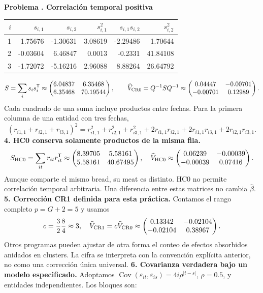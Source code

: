 \documentclass[11pt,a4paper]{article}
\newcommand{\T}{^{\mathsf T}}
\DeclareMathOperator{\Cov}{Cov}
\theoremstyle{definition}
\newcounter{problema}
\newenvironment{resuelto}[1]{\refstepcounter{problema}\par\medskip\Needspace{6\baselineskip}\textbf{Problema \theproblema. #1}\par}{\par\medskip}
\newcommand{\eps}{\varepsilon}
\begin{document}
\begin{resuelto}{Correlación temporal positiva}
\begin{center}\small
\begin{tabular}{rrrrrr}
\toprule
$i$&$s_{i,1}$&$s_{i,2}$&$s_{i,1}^2$&$s_{i,1}s_{i,2}$&$s_{i,2}^2$\\
\midrule
1&1.75676&-1.30631&3.08619&-2.29486&1.70644\\
2&-0.03604&6.46847&0.0013&-0.2331&41.84108\\
3&-1.72072&-5.16216&2.96088&8.88264&26.64792\\
\bottomrule
\end{tabular}
\end{center}
\[
S=\sum_i s_is_i\T\approx\begin{pmatrix}
6.04837&6.35468\\6.35468&70.19544
\end{pmatrix},\qquad \widehat V_{\rm CR0}=Q^{-1}SQ^{-1}\approx\begin{pmatrix}
0.04447&-0.00701\\-0.00701&0.12989
\end{pmatrix}.
\]
Cada cuadrado de una suma incluye productos entre fechas. Para la primera columna de una entidad con tres fechas,
\[
(r_{i1,1}+r_{i2,1}+r_{i3,1})^2
=r_{i1,1}^2+r_{i2,1}^2+r_{i3,1}^2
+2r_{i1,1}r_{i2,1}+2r_{i1,1}r_{i3,1}+2r_{i2,1}r_{i3,1}.
\]
\textbf{4. HC0 conserva solamente productos de la misma fila.}
\[
S_{\rm HC0}=\sum_{it}r_{it}r_{it}\T\approx\begin{pmatrix}
8.39705&5.58161\\5.58161&40.67495
\end{pmatrix},\quad
\widehat V_{\rm HC0}\approx\begin{pmatrix}
0.06239&-0.00039\\-0.00039&0.07416
\end{pmatrix}.
\]
Aunque comparte el mismo bread, su meat es distinto. HC0 no permite correlación temporal arbitraria. Una diferencia entre estas matrices no cambia $\widehat\beta$.
\textbf{5. Corrección CR1 definida para esta práctica.} Contamos el rango completo $p=G+2=5$ y usamos
\[
c=\frac{3}{2}\frac{8}{4}\approx3,\quad \widehat V_{\rm CR1}=c\widehat V_{\rm CR0}\approx\begin{pmatrix}
0.13342&-0.02104\\-0.02104&0.38967
\end{pmatrix}.
\]
Otros programas pueden ajustar de otra forma el conteo de efectos absorbidos anidados en clusters. La cifra se interpreta con la convención explícita anterior, no como una corrección única universal.
\textbf{6. Covarianza verdadera bajo un modelo especificado.} Adoptamos $\Cov(\eps_{it},\eps_{is})=4i\rho^{|t-s|}$, $\rho=0.5$, y entidades independientes. Los bloques son:

\end{resuelto}
\end{document}
